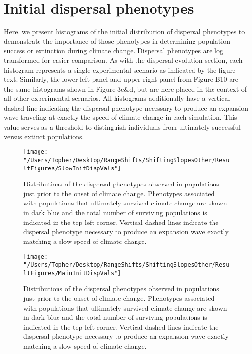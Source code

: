 \documentclass[12pt, oneside]{article}
\begin{document}
\newpage

\section*{Initial dispersal phenotypes}
Here, we present histograms of the initial distribution of dispersal phenotypes to demonstrate the importance of those phenotypes in determining population success or extinction during climate change. Dispersal phenotypes are log transformed for easier comparison. As with the dispersal evolution section, each histogram represents a single experimental scenario as indicated by the figure text. Similarly, the lower left panel and upper right panel from Figure B10 are the same histograms shown in Figure 3c\&d, but are here placed in the context of all other experimental scenarios. All histograms additionally have a vertical dashed line indicating the dispersal phenotype necessary to produce an expansion wave traveling at exactly the speed of climate change in each simulation. This value serves as a threshold to distinguish individuals from ultimately successful versus extinct populations.

\begin{figure}
\centering
\texttt{[image: "/Users/Topher/Desktop/RangeShifts/ShiftingSlopesOther/ResultFigures/SlowInitDispVals"]}
\vspace{-5mm}
\caption[LoF entry]{Distributions of the dispersal phenotypes observed in populations just prior to the onset of climate change. Phenotypes associated with populations that ultimately survived climate change are shown in dark blue and the total number of surviving populations is indicated in the top left corner. Vertical dashed lines indicate the dispersal phenotype necessary to produce an expansion wave exactly matching a slow speed of climate change.}
\label{fig:InitDispSlow}
\end{figure}

\begin{figure}
\centering
\texttt{[image: "/Users/Topher/Desktop/RangeShifts/ShiftingSlopesOther/ResultFigures/MainInitDispVals"]}
\vspace{-5mm}
\caption[LoF entry]{Distributions of the dispersal phenotypes observed in populations just prior to the onset of climate change. Phenotypes associated with populations that ultimately survived climate change are shown in dark blue and the total number of surviving populations is indicated in the top left corner. Vertical dashed lines indicate the dispersal phenotype necessary to produce an expansion wave exactly matching a slow speed of climate change.}
\label{fig:InitDispMain}
\end{figure}
\end{document}
